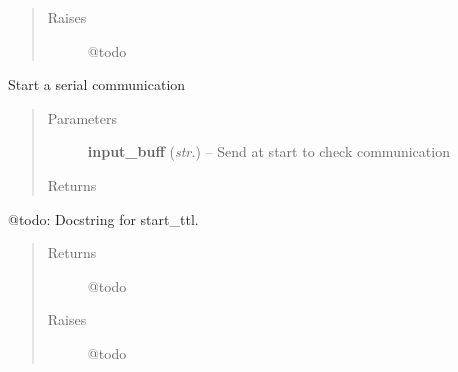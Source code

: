 \documentclass[letterpaper,10pt,english]{sphinxmanual}
\begin{document}
\begin{fulllineitems}
\begin{fulllineitems}
\begin{quote}
\begin{description}
\item[{Raises}] \leavevmode
@todo

\end{description}\end{quote}

\end{fulllineitems}


\begin{fulllineitems}
\label{enuActor.Devices:enuActor.Devices.Device.OperationDevice.op_start_serial}
Start a serial communication
\begin{quote}\begin{description}
\item[{Parameters}] \leavevmode
\textbf{input\_buff} (\emph{str.}) -- Send at start to check communication

\item[{Returns}] \leavevmode
{}

\end{description}\end{quote}

\end{fulllineitems}


\begin{fulllineitems}
\label{enuActor.Devices:enuActor.Devices.Device.OperationDevice.op_start_ttl}
@todo: Docstring for start\_ttl.
\begin{quote}\begin{description}
\item[{Returns}] \leavevmode
@todo

\item[{Raises}] \leavevmode
@todo

\end{description}\end{quote}

\end{fulllineitems}


\end{fulllineitems}

\end{document}
